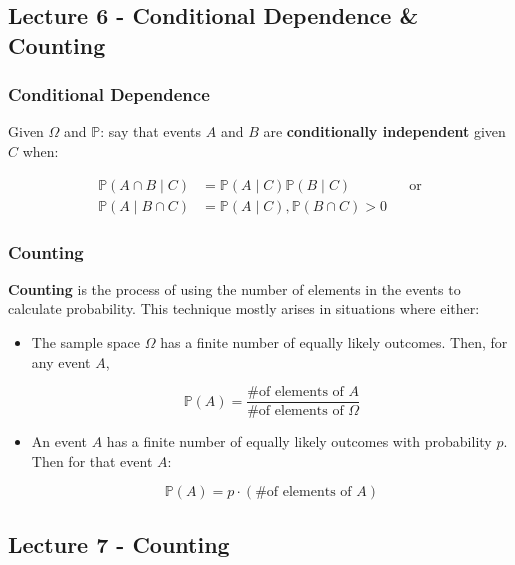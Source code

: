 \documentclass{article}
\begin{document}
\medskip\hline
\subsection{Lecture 6 - Conditional Dependence \& Counting}

\subsubsection{Conditional Dependence}

Given $\Omega$ and $\mathbb{P}$: say that events $A$ and $B$ are
\textbf{conditionally independent} given $C$ when:

\begin{equation}
  \tag{Conditional Independence Def}
  \boxed{
    \begin{aligned}
      \mathbb{P}(A \cap B \mid C)
      &= \mathbb{P}(A \mid C) \mathbb{P}(B \mid C)
      && \text{or} \\
      \mathbb{P}(A \mid B \cap C)
      &= \mathbb{P}(A \mid C), \mathbb{P}(B \cap C) > 0
    \end{aligned}
  }
\end{equation}

\subsubsection{Counting}

\textbf{Counting} is the process of using the number of elements in
the events to calculate probability. This technique mostly arises in
situations where either:

\begin{itemize}
\item The sample space $\Omega$ has a finite number of equally likely
  outcomes. Then, for any event $A$,

  \[
    \mathbb{P}(A) = \frac{\text{\# of elements of } A}
    {\text{\# of elements of } \Omega}
  \]

\item An event $A$ has a finite number of equally likely outcomes with
  probability $p$. Then for that event $A$:

  \[
    \mathbb{P}(A) = p \cdot (\text{\# of elements of }A)
  \]
\end{itemize}


\medskip\hline
\subsection{Lecture 7 - Counting}
\end{document}
